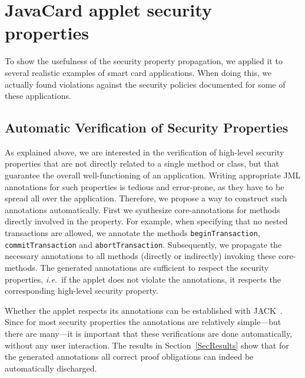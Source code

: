
\section{JavaCard applet security properties}
To show the usefulness of the security property propagation, we applied it to
several realistic examples of smart card applications. When doing
this, we actually found violations against the security policies
documented for some of these applications.

\subsection{Automatic Verification of Security Properties}\label{SecVerif}
As explained above, we are interested in the verification of
high-level security properties that are not directly related to a
single method or class, but that guarantee the overall
well-functioning of an application. Writing appropriate JML
annotations for such properties is tedious and error-prone, as they
have to be spread all over the application. Therefore, we propose a
way to construct such annotations automatically. First we synthesize
core-annotations for methods directly involved in the property.  For
example, when specifying that no nested transactions are allowed, we
annotate the methods \texttt{beginTransaction},
\texttt{commitTransaction} and
\texttt{abortTransaction}. Subsequently, we propagate the necessary 
annotations to all methods (directly or indirectly) invoking these
core-methods.  The generated annotations are sufficient to respect the
security properties, \emph{i.e.}~if the applet does not violate the
annotations, it respects the corresponding high-level security
property.

Whether the applet respects its annotations can be established with
JACK~\cite{BRL-JACK}. Since for most security properties the
annotations are relatively simple---but there are many---it is
important that these verifications are done automatically, without any
user interaction. The results in Section~\ref{SecResults} show that
for the generated annotations all correct proof obligations can indeed
be automatically discharged.

